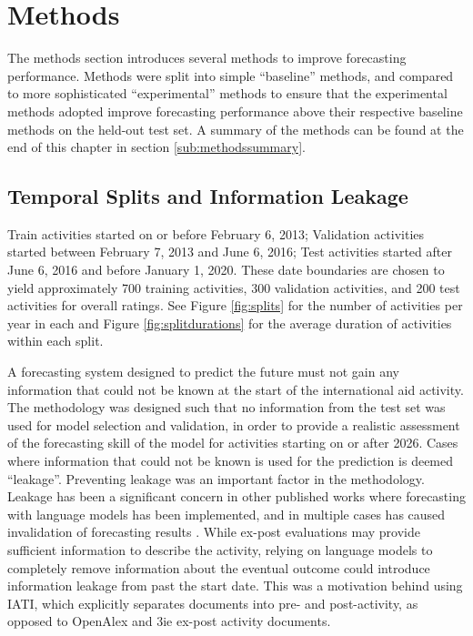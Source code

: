 \section{Methods}
The methods section introduces several methods to improve forecasting performance. Methods were split into simple ``baseline'' methods, and compared to more sophisticated ``experimental'' methods to ensure that the experimental methods adopted improve forecasting performance above their respective baseline methods on the held-out test set. A summary of the methods can be found at the end of this chapter in section \ref{sub:methodssummary}.

\subsection{Temporal Splits and Information Leakage} \label{sub:temporalleakage}
Train activities started on or before February 6, 2013; Validation activities started between February 7, 2013 and June 6, 2016; Test activities started after June 6, 2016 and before January 1, 2020. These date boundaries are chosen to yield approximately 700 training activities, 300 validation activities, and 200 test activities for overall ratings. See Figure \ref{fig:splits} for the number of activities per year in each and Figure \ref{fig:splitdurations} for the average duration of activities within each split.

A forecasting system designed to predict the future must not gain any information that could not be known at the start of the international aid activity. The methodology was designed such that no information from the test set was used for model selection and validation, in order to provide a realistic assessment of the forecasting skill of the model for activities starting on or after 2026. Cases where information that could not be known is used for the prediction is deemed ``leakage''. Preventing leakage was an important factor in the methodology. Leakage has been a significant concern in other published works where forecasting with language models has been implemented, and in multiple cases has caused invalidation of forecasting results \citep{palekaPitfallsEvaluatingLanguage2025}. While ex-post evaluations may provide sufficient information to describe the activity, relying on language models to completely remove information about the eventual outcome could introduce information leakage from past the start date. This was a motivation behind using IATI, which explicitly separates documents into pre- and post-activity, as opposed to OpenAlex and 3ie ex-post activity documents.

